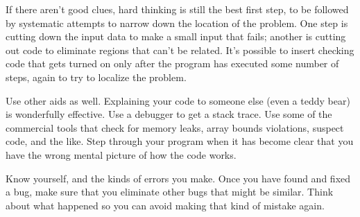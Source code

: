\documentclass[draftclsnofoot,journal,onecolumn,12pt]{IEEEtran}
\begin{document}
If there aren't good clues, hard thinking is still the best first step, to be followed by systematic attempts to narrow down the location of the problem. One step is cutting down the input data to make a small input that fails; another is cutting out code to eliminate regions that can't be related. It's possible to insert checking code that gets turned on only after the program has executed some number of steps, again to try to localize the problem.

Use other aids as well. Explaining your code to someone else (even a teddy bear) is wonderfully effective. Use a debugger to get a stack trace. Use some of the commercial tools that check for memory leaks, array bounds violations, suspect code, and the like. Step through your program when it has become clear that you have the wrong mental picture of how the code works.

Know yourself, and the kinds of errors you make. Once you have found and fixed a bug, make sure that you eliminate other bugs that might be similar. Think about what happened so you can avoid making that kind of mistake again.
\end{document}
